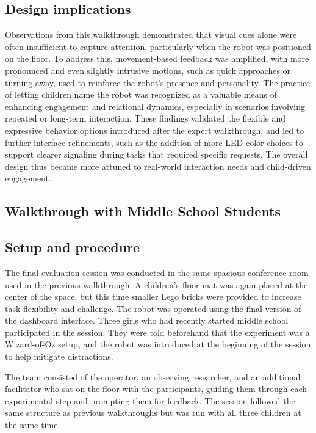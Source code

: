 \documentclass[a4paper]{usiinfbachelorproject}
\begin{document}
\subsection*{\textbf{Design implications}}
Observations from this walkthrough demonstrated that visual cues alone were often insufficient to capture attention, particularly when the robot was positioned on the floor.
To address this, movement-based feedback was amplified, with more pronounced and even slightly intrusive motions, such as quick approaches or turning away, used to reinforce the robot's presence and personality.
The practice of letting children name the robot was recognized as a valuable means of enhancing engagement and relational dynamics, especially in scenarios involving repeated or long-term interaction.
These findings validated the flexible and expressive behavior options introduced after the expert walkthrough, and led to further interface refinements, such as the addition of more LED color choices to support clearer signaling during tasks that required specific requests.
The overall design thus became more attuned to real-world interaction needs and child-driven engagement.

\subsection{\textbf{Walkthrough with Middle School Students}}\label{sec:middle-school-walkthrough}
\subsection*{\textbf{Setup and procedure}}
The final evaluation session was conducted in the same spacious conference room used in the previous walkthrough.
A children's floor mat was again placed at the center of the space, but this time smaller Lego bricks were provided to increase task flexibility and challenge.
The robot was operated using the final version of the dashboard interface.
Three girls who had recently started middle school participated in the session.
They were told beforehand that the experiment was a Wizard-of-Oz setup, and the robot was introduced at the beginning of the session to help mitigate distractions.

The team consisted of the operator, an observing researcher, and an additional facilitator who sat on the floor with the participants, guiding them through each experimental step and prompting them for feedback.
The session followed the same structure as previous walkthroughs but was run with all three children at the same time.
\end{document}
